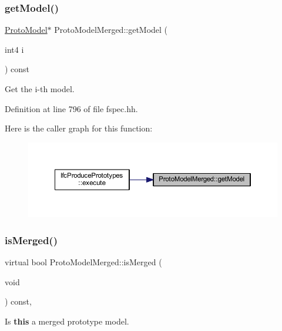 \subsubsection{\texorpdfstring{getModel()}{getModel()}}
{\footnotesize\ttfamily \mbox{\hyperlink{class_proto_model}{Proto\+Model}}$\ast$ Proto\+Model\+Merged\+::get\+Model (\begin{DoxyParamCaption}\item[{int4}]{i }\end{DoxyParamCaption}) const\hspace{0.3cm}{\ttfamily [inline]}}



Get the i-\/th model. 



Definition at line 796 of file fspec.\+hh.

Here is the caller graph for this function\+:
\nopagebreak
\begin{figure}[H]
\begin{center}
\leavevmode
\includegraphics[width=350pt]{class_proto_model_merged_a661295ea5cf3542cfc25b28fefb6a264_icgraph}
\end{center}
\end{figure}
\mbox{\label{class_proto_model_merged_aea3dceb1497499800015607bbfd2d863}} 
\subsubsection{\texorpdfstring{isMerged()}{isMerged()}}
{\footnotesize\ttfamily virtual bool Proto\+Model\+Merged\+::is\+Merged (\begin{DoxyParamCaption}\item[{void}]{ }\end{DoxyParamCaption}) const\hspace{0.3cm}{\ttfamily [inline]}, {\ttfamily [virtual]}}



Is {\bfseries{this}} a merged prototype model. 




